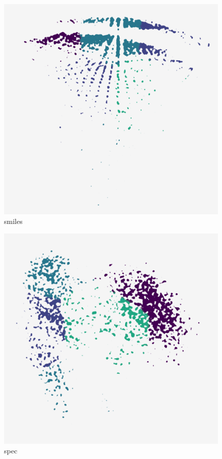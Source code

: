 \begin{subfigure}[b]{.25\linewidth}
    \centering
    \includegraphics[width=\textwidth]{outputs/DRplots/plots/PCA_smiles.png}
    \caption{smiles}
    \label{fig:PCA_smiles}
\end{subfigure}
\begin{subfigure}[b]{.25\linewidth}
    \centering
    \includegraphics[width=\textwidth]{outputs/DRplots/plots/PCA_spec.png}
    \caption{spec}
    \label{fig:PCA_spec}
\end{subfigure}